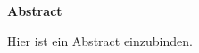 \cleardoublepage
{}
\thispagestyle{section}

\noindent \textbf{\textsf{\large Abstract}}\newline

\vspace{1.2em}
\noindent Hier ist ein Abstract einzubinden.